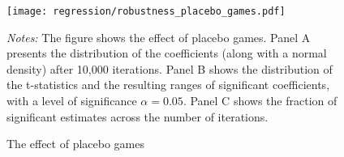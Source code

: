 \begin{figure}[t]\centering
	\texttt{[image: regression/robustness\_placebo\_games.pdf]}
	\begin{minipage}{0.95\linewidth}
		\caption{The effect of placebo games}\label{fig_soc_ext:robustness_placebo_games}
		\scriptsize{\emph{Notes:} The figure shows the effect of placebo games. Panel A presents the distribution of the coefficients (along with a normal density) after 10,000 iterations. Panel B shows the distribution of the t-statistics and the resulting ranges of significant coefficients, with a level of significance $\alpha=0.05$. Panel C shows the fraction of significant estimates across the number of iterations.}
	\end{minipage}
\end{figure}